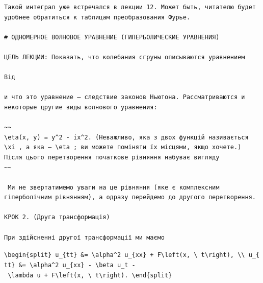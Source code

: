 \documentclass[
  ukrainian,
]{article}
\begin{document}
\begin{verbatim}
Такой интеграл уже встречался в лекции 12. Может быть, читателю будет удобнее обратиться к таблицам преобразования Фурье.

# ОДНОМЕРНОЕ ВОЛНОВОЕ УРАВНЕНИЕ (ГИПЕРБОЛИЧЕСКИЕ УРАВНЕНИЯ)

ЦЕЛЬ ЛЕКЦИИ: Показать, что колебания сгруны описываются уравнением

Від

и что это уравнение — следствие законов Ньютона. Рассматриваются и некоторые другие виды волнового уравнения:

~~
\eta(x, y) = y^2 - ix^2. (Неважливо, яка з двох функцій називається \xi , а яка — \eta ; ви можете поміняти їх місцями, якщо хочете.) Після цього перетворення початкове рівняння набуває вигляду
~~

 Ми не звертатимемо уваги на це рівняння (яке є комплексним гіперболічним рівнянням), а одразу перейдемо до другого перетворення.

КРОК 2. (Друга трансформація)

При здійсненні другої трансформації ми маємо
\end{verbatim}

\texttt{\textbackslash{}begin\{split\}\ u\_\{tt\}\ \&=\ \textbackslash{}alpha\^{}2\ u\_\{xx\}\ +\ F\textbackslash{}left(x,\ \textbackslash{}\ t\textbackslash{}right),\ \textbackslash{}\textbackslash{}\ u\_\{tt\}\ \&=\ \textbackslash{}alpha\^{}2\ u\_\{xx\}\ -\ \textbackslash{}beta\ u\_t\ -\ \textbackslash{}lambda\ u\ +\ F\textbackslash{}left(x,\ \textbackslash{}\ t\textbackslash{}right).\ \textbackslash{}end\{split\}}
\end{document}
